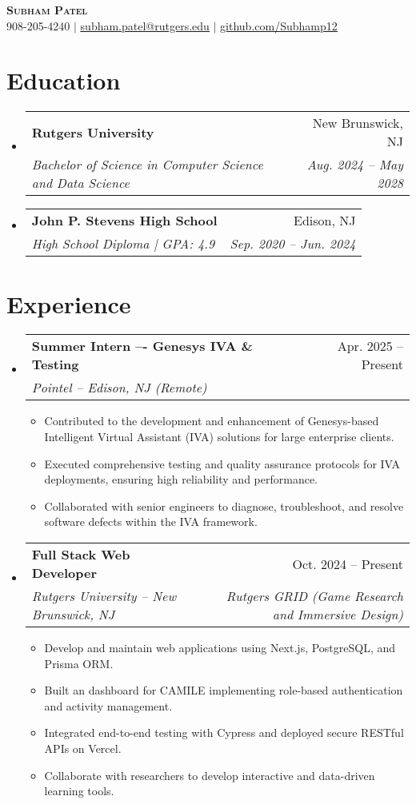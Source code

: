 \documentclass[letterpaper,11pt]{article}
\makeatletter
\newcommand{\resumeItem}[1]{
  \item\small{
    {#1 \vspace{-2pt}}
  }
}
\newcommand{\resumeSubheading}[4]{
  \vspace{-2pt}\item
    \begin{tabular*}{0.97\textwidth}[t]{l@{\extracolsep{\fill}}r}
      \textbf{#1} & #2 \\
      \textit{\small#3} & \textit{\small #4} \\
    \end{tabular*}\vspace{-7pt}
}
\newcommand{\resumeItemListStart}{\begin{itemize}}
\newcommand{\resumeItemListEnd}{\end{itemize}\vspace{-5pt}}
\makeatother
\begin{document}
\begin{center}
    \textbf{\Huge \scshape Subham Patel} \\ \vspace{1pt}
    \small 908-205-4240 $|$ \href{mailto:subham.patel@rutgers.edu}{\underline{subham.patel@rutgers.edu}} $|$ 
    \href{https://github.com/Subhamp12}{\underline{github.com/Subhamp12}}
\end{center}

\section{Education}
  \begin{itemize}[leftmargin=0.15in, label={}]
    \resumeSubheading
      {Rutgers University}{New Brunswick, NJ}
      {Bachelor of Science in Computer Science and Data Science}{Aug. 2024 -- May 2028}
    \resumeSubheading
      {John P. Stevens High School}{Edison, NJ}
      {High School Diploma | GPA: 4.9}{Sep. 2020 -- Jun. 2024}
  \end{itemize}

\section{Experience}
  \begin{itemize}[leftmargin=0.15in, label={}]
    \resumeSubheading
      {Summer Intern –- Genesys IVA \& Testing}{Apr. 2025 -- Present}
      {Pointel -- Edison, NJ (Remote)}{}
      \resumeItemListStart
        \resumeItem{Contributed to the development and enhancement of Genesys-based Intelligent Virtual Assistant (IVA) solutions for large enterprise clients.}
        \resumeItem{Executed comprehensive testing and quality assurance protocols for IVA deployments, ensuring high reliability and performance.}
        \resumeItem{Collaborated with senior engineers to diagnose, troubleshoot, and resolve software defects within the IVA framework.}
      \resumeItemListEnd
    \resumeSubheading
      {Full Stack Web Developer}{Oct. 2024 -- Present}
      {Rutgers University -- New Brunswick, NJ}{Rutgers GRID (Game Research and Immersive Design)}
      \resumeItemListStart
        \resumeItem{Develop and maintain web applications using Next.js, PostgreSQL, and Prisma ORM.}
        \resumeItem{Built an dashboard for CAMILE implementing role-based authentication and activity management.}
        \resumeItem{Integrated end-to-end testing with Cypress and deployed secure RESTful APIs on Vercel.}
        \resumeItem{Collaborate with researchers to develop interactive and data-driven learning tools.}
      \resumeItemListEnd
  \end{itemize}
\end{document}
